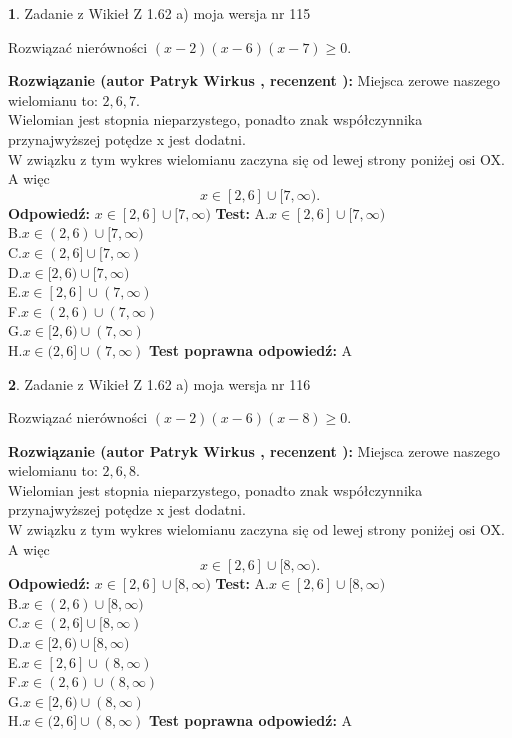 \documentclass[12pt, a4paper]{article}
\theoremstyle{definition} %
\newtheorem{zad}{}
\newcommand{\zadStart}[1]{\begin{zad}#1\newline}
\newcommand{\zadStop}{\end{zad}}
\newcommand{\rozwStart}[2]{\noindent \textbf{Rozwiązanie (autor #1 , recenzent #2): }\newline}
\newcommand{\rozwStop}{\newline}
\newcommand{\odpStart}{\noindent \textbf{Odpowiedź:}\newline}
\newcommand{\odpStop}{\newline}
\newcommand{\testStart}{\noindent \textbf{Test:}\newline}
\newcommand{\testStop}{\newline}
\newcommand{\kluczStart}{\noindent \textbf{Test poprawna odpowiedź:}\newline}
\newcommand{\kluczStop}{\newline}
\begin{document}
\zadStart{Zadanie z Wikieł Z 1.62 a) moja wersja nr 115}

Rozwiązać nierówności $(x-2)(x-6)(x-7)\ge0$.
\zadStop
\rozwStart{Patryk Wirkus}{}
Miejsca zerowe naszego wielomianu to: $2, 6, 7$.\\
Wielomian jest stopnia nieparzystego, ponadto znak współczynnika przy\linebreak najwyższej potędze x jest dodatni.\\ W związku z tym wykres wielomianu zaczyna się od lewej strony poniżej osi OX. A więc $$x \in [2,6] \cup [7,\infty).$$
\rozwStop
\odpStart
$x \in [2,6] \cup [7,\infty)$
\odpStop
\testStart
A.$x \in [2,6] \cup [7,\infty)$\\
B.$x \in (2,6) \cup [7,\infty)$\\
C.$x \in (2,6] \cup [7,\infty)$\\
D.$x \in [2,6) \cup [7,\infty)$\\
E.$x \in [2,6] \cup (7,\infty)$\\
F.$x \in (2,6) \cup (7,\infty)$\\
G.$x \in [2,6) \cup (7,\infty)$\\
H.$x \in (2,6] \cup (7,\infty)$
\testStop
\kluczStart
A
\kluczStop



\zadStart{Zadanie z Wikieł Z 1.62 a) moja wersja nr 116}

Rozwiązać nierówności $(x-2)(x-6)(x-8)\ge0$.
\zadStop
\rozwStart{Patryk Wirkus}{}
Miejsca zerowe naszego wielomianu to: $2, 6, 8$.\\
Wielomian jest stopnia nieparzystego, ponadto znak współczynnika przy\linebreak najwyższej potędze x jest dodatni.\\ W związku z tym wykres wielomianu zaczyna się od lewej strony poniżej osi OX. A więc $$x \in [2,6] \cup [8,\infty).$$
\rozwStop
\odpStart
$x \in [2,6] \cup [8,\infty)$
\odpStop
\testStart
A.$x \in [2,6] \cup [8,\infty)$\\
B.$x \in (2,6) \cup [8,\infty)$\\
C.$x \in (2,6] \cup [8,\infty)$\\
D.$x \in [2,6) \cup [8,\infty)$\\
E.$x \in [2,6] \cup (8,\infty)$\\
F.$x \in (2,6) \cup (8,\infty)$\\
G.$x \in [2,6) \cup (8,\infty)$\\
H.$x \in (2,6] \cup (8,\infty)$
\testStop
\kluczStart
A
\kluczStop
\end{document}

